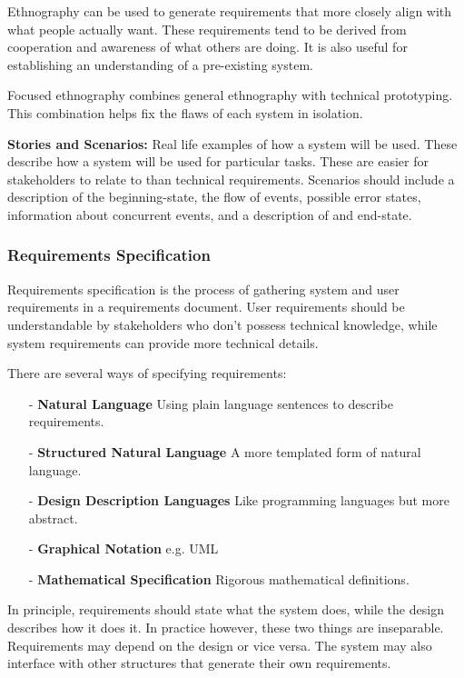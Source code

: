 \documentclass[12pt]{article}
\begin{document}
Ethnography can be used to generate requirements that more closely align with what people actually want. These requirements tend to be derived from cooperation and awareness of what others are doing. It is also useful for establishing an understanding of a pre-existing system.

Focused ethnography combines general ethnography with technical prototyping. This combination helps fix the flaws of each system in isolation.

\textbf{Stories and Scenarios:} Real life examples of how a system will be used. These describe how a system will be used for particular tasks. These are easier for stakeholders to relate to than technical requirements. Scenarios should include a description of the beginning-state, the flow of events, possible error states, information about concurrent events, and a description of and end-state.

\subsubsection*{Requirements Specification}

Requirements specification is the process of gathering system and user requirements in a requirements document. User requirements should be understandable by stakeholders who don't possess technical knowledge, while system requirements can provide more technical details.

\pagebreak
There are several ways of specifying requirements:
\begin{itemize}
    \item [-] \textbf{Natural Language} Using plain language sentences to describe requirements.
    \item [-] \textbf{Structured Natural Language} A more templated form of natural language.
    \item [-] \textbf{Design Description Languages} Like programming languages but more abstract.
    \item [-] \textbf{Graphical Notation} e.g. UML
    \item [-] \textbf{Mathematical Specification} Rigorous mathematical definitions.
\end{itemize}

In principle, requirements should state what the system does, while the design describes how it does it. In practice however, these two things are inseparable. Requirements may depend on the design or vice versa. The system may also interface with other structures that generate their own requirements.
\end{document}
